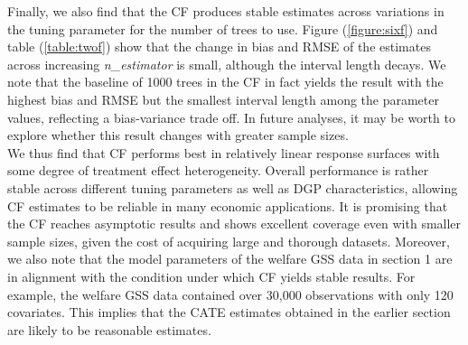 \documentclass[12pt]{article}
\begin{document}
Finally, we also find that the CF produces stable estimates across variations in
the tuning parameter for the number of trees to use. Figure (\ref{figure:sixf})
and table (\ref{table:twof}) show that the change in bias and RMSE of the
estimates across increasing \textit{n\_estimator} is small, although the
interval length decays. We note that the baseline of 1000 trees in the CF in
fact yields the result with the highest bias and RMSE but the smallest interval
length among the parameter values, reflecting a bias-variance trade off. In
future analyses, it may be worth to explore whether this result changes with
greater sample sizes. \\

We thus find that CF performs best in relatively linear response surfaces with
some degree of treatment effect heterogeneity. Overall performance is rather
stable across different tuning parameters as well as DGP characteristics,
allowing CF estimates to be reliable in many economic applications. It is
promising that the CF reaches asymptotic results and shows excellent coverage
even with smaller sample sizes, given the cost of acquiring large and thorough
datasets. Moreover, we also note that the model parameters of the welfare GSS
data in section 1 are in alignment with the condition under which CF yields
stable results. For example, the welfare GSS data contained over 30,000
observations with only 120 covariates. This implies that the CATE estimates
obtained in the earlier section are likely to be reasonable estimates. 
\end{document}
